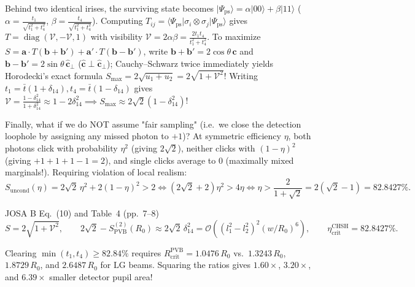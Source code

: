 \documentclass[10pt,letterpaper]{article}
\newcommand{\ket}[1]{\lvert #1 \rangle}
\newcommand{\bra}[1]{\langle #1 \rvert}
\numberwithin{equation}{section}
\begin{document}
Behind two identical irises, the surviving state becomes $\ket{\Psi_{\mathrm{ps}}} = \alpha\ket{00} + \beta\ket{11}$ ($\alpha = \frac{t_1}{\sqrt{t_1^2+t_4^2}}$, $\beta = \frac{t_4}{\sqrt{t_1^2+t_4^2}}$). Computing $T_{ij} = \bra{\Psi_{\mathrm{ps}}}\sigma_i\otimes\sigma_j\ket{\Psi_{\mathrm{ps}}}$ gives $T = \operatorname{diag}(\mathcal{V}, -\mathcal{V}, 1)$ with visibility $\mathcal{V} = 2\alpha\beta = \frac{2 t_1 t_4}{t_1^2+t_4^2}$. To maximize $S = \mathbf{a}\cdot T(\mathbf{b}+\mathbf{b}') + \mathbf{a}'\cdot T(\mathbf{b}-\mathbf{b}')$, write $\mathbf{b}+\mathbf{b}' = 2\cos\theta\,\hat{\mathbf{c}}$ and $\mathbf{b}-\mathbf{b}' = 2\sin\theta\,\hat{\mathbf{c}}_\perp$ ($\hat{\mathbf{c}} \perp \hat{\mathbf{c}}_\perp$); Cauchy--Schwarz twice immediately yields Horodecki's exact formula $S_{\max} = 2\sqrt{u_1 + u_2} = 2\sqrt{1 + \mathcal{V}^2}$! Writing $t_1 = \bar{t}(1+\delta_{14}), t_4 = \bar{t}(1-\delta_{14})$ gives $\mathcal{V} = \frac{1-\delta_{14}^2}{1+\delta_{14}^2} \approx 1 - 2\delta_{14}^2 \implies S_{\max} \approx 2\sqrt{2}(1 - \delta_{14}^2)$!

Finally, what if we do NOT assume "fair sampling" (i.e.\ we close the detection loophole by assigning any missed photon to $+1$)? At symmetric efficiency $\eta$, both photons click with probability $\eta^2$ (giving $2\sqrt{2}$), neither clicks with $(1-\eta)^2$ (giving $+1+1+1-1 = 2$), and single clicks average to $0$ (maximally mixed marginals!). Requiring violation of local realism:
\begin{equation}
  S_{\mathrm{uncond}}(\eta) = 2\sqrt{2}\,\eta^2 + 2(1-\eta)^2 > 2 \iff (2\sqrt{2}+2)\eta^2 > 4\eta \iff \eta > \frac{2}{1+\sqrt{2}} = 2(\sqrt{2}-1) = \mathbf{82.8427\%}.
\end{equation}

\begin{paperhit}{JOSA B Eq.~(10) and Table~4 (pp.~7--8)}
\[
  S = 2\sqrt{1+\mathcal{V}^2}, \qquad 2\sqrt{2} - S_{\mathrm{PVB}}^{(2)}(R_0) \approx 2\sqrt{2}\,\delta_{14}^2 = \mathcal{O}\!\left((l_1^2-l_2^2)^2(w/R_0)^6\right), \qquad \eta_{\mathrm{crit}}^{\mathrm{CHSH}} = 82.8427\%.
\]
\end{paperhit}

\begin{pencilbox}
Clearing $\min(t_1,t_4) \ge 82.84\%$ requires $R_{\mathrm{crit}}^{\mathrm{PVB}} = 1.0476\,R_0$ vs.\ $1.3243\,R_0$, $1.8729\,R_0$, and $2.6487\,R_0$ for $\mathrm{LG}$ beams. Squaring the ratios gives $\mathbf{1.60\times}$, $\mathbf{3.20\times}$, and $\mathbf{6.39\times}$ smaller detector pupil area!
\end{pencilbox}
\end{document}
